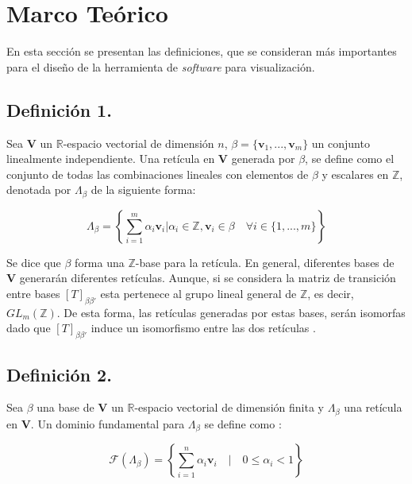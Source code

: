 \documentclass{llncs}
\begin{document}
\section{Marco Te\'orico}
\label{Marco}
En esta secci\'on se presentan las definiciones, que se consideran m\'as importantes para el diseño de la herramienta de \textit{software} para visualización.

	\subsection*{Definici\'on 1.} Sea $\mathbf{V}$ un $\mathbb{R}$-espacio vectorial de dimensi\'on $n$, $\beta = \{ \mathbf{v}_1,..., \mathbf{v}_m \}$ un conjunto linealmente independiente. Una ret\'icula en $\mathbf{V}$ generada por $\beta$, se define como el conjunto de todas las combinaciones lineales con elementos de $\beta$ y escalares en $\mathbb{Z}$, denotada por $\Lambda_\beta$ de la siguiente forma:
	
	\[ \Lambda_{\beta} = \left\{ \sum _{{i=1}}^{{m}}{\alpha_{i}}{\mathbf  {v}}_{i} | {\alpha}_{i} \in \mathbb{Z},{\mathbf  {v}}_{i}\in \beta  \quad \forall i \in \{1,..., m\} \right\} \]

	Se dice que $\beta$ forma una $\mathbb{Z}$-base para la ret\'icula. En general, diferentes bases de $\mathbf{V}$ generar\'an diferentes ret\'iculas. Aunque, si se considera la matriz de transici\'on entre bases $\left[ T \right]_{\beta \beta'}$ esta pertenece al grupo lineal general de $\mathbb{Z}$, es decir, $\mathit{GL}_{m}(\mathbb{Z})$. De esta forma, las ret\'iculas generadas por estas bases, ser\'an isomorfas dado que $\left[ T \right]_{\beta \beta'}$ induce un isomorfismo entre las dos ret\'iculas \cite{b11}.

	\subsection*{Definici\'on 2.} Sea $\beta$ una base de $\mathbf{V}$ un $\mathbb{R}$-espacio vectorial de dimensi\'on finita y $\Lambda_\beta$ una ret\'icula en $\mathbf{V}$. Un dominio fundamental para $\Lambda_\beta$ se define como \cite{b11}: 

		\[\mathcal{F}(\Lambda_{\beta}) = \left\{ \sum _{{i=1}}^{{n}}{\alpha_{i}}{\mathbf  {v}}_{i}\quad | \quad 0 \leq \alpha_{i} < 1 \right\} \]
\end{document}
